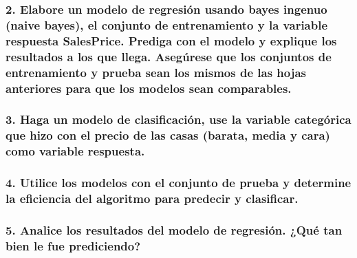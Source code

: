 \documentclass[
]{article}
\begin{document}
\hypertarget{elabore-un-modelo-de-regresiuxf3n-usando-bayes-ingenuo-naive-bayes-el-conjunto-de-entrenamiento-y-la-variable-respuesta-salesprice.-prediga-con-el-modelo-y-explique-los-resultados-a-los-que-llega.-aseguxfarese-que-los-conjuntos-de-entrenamiento-y-prueba-sean-los-mismos-de-las-hojas-anteriores-para-que-los-modelos-sean-comparables.}{%
\subsubsection{2. Elabore un modelo de regresión usando bayes ingenuo
(naive bayes), el conjunto de entrenamiento y la variable respuesta
SalesPrice. Prediga con el modelo y explique los resultados a los que
llega. Asegúrese que los conjuntos de entrenamiento y prueba sean los
mismos de las hojas anteriores para que los modelos sean
comparables.}\label{elabore-un-modelo-de-regresiuxf3n-usando-bayes-ingenuo-naive-bayes-el-conjunto-de-entrenamiento-y-la-variable-respuesta-salesprice.-prediga-con-el-modelo-y-explique-los-resultados-a-los-que-llega.-aseguxfarese-que-los-conjuntos-de-entrenamiento-y-prueba-sean-los-mismos-de-las-hojas-anteriores-para-que-los-modelos-sean-comparables.}}

\hypertarget{haga-un-modelo-de-clasificaciuxf3n-use-la-variable-categuxf3rica-que-hizo-con-el-precio-de-las-casas-barata-media-y-cara-como-variable-respuesta.}{%
\subsubsection{3. Haga un modelo de clasificación, use la variable
categórica que hizo con el precio de las casas (barata, media y cara)
como variable
respuesta.}\label{haga-un-modelo-de-clasificaciuxf3n-use-la-variable-categuxf3rica-que-hizo-con-el-precio-de-las-casas-barata-media-y-cara-como-variable-respuesta.}}

\hypertarget{utilice-los-modelos-con-el-conjunto-de-prueba-y-determine-la-eficiencia-del-algoritmo-para-predecir-y-clasificar.}{%
\subsubsection{4. Utilice los modelos con el conjunto de prueba y
determine la eficiencia del algoritmo para predecir y
clasificar.}\label{utilice-los-modelos-con-el-conjunto-de-prueba-y-determine-la-eficiencia-del-algoritmo-para-predecir-y-clasificar.}}

\hypertarget{analice-los-resultados-del-modelo-de-regresiuxf3n.-quuxe9-tan-bien-le-fue-prediciendo}{%
\subsubsection{5. Analice los resultados del modelo de regresión. ¿Qué
tan bien le fue
prediciendo?}\label{analice-los-resultados-del-modelo-de-regresiuxf3n.-quuxe9-tan-bien-le-fue-prediciendo}}
\end{document}
